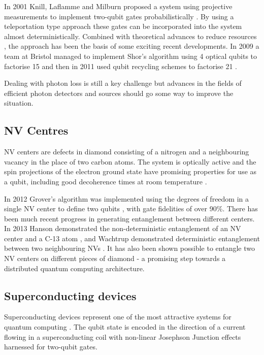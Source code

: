 In 2001 Knill, Laflamme and Milburn proposed a system using projective measurements to implement two-qubit gates probabilistically \cite{klm}. By using a teleportation type approach these gates can be incorporated into the system almost deterministically. Combined with theoretical advances to reduce resources \cite{science_loqc_review}, the approach has been the basis of some exciting recent developments. In 2009 a team at Bristol managed to implement Shor's algorithm using 4 optical qubits to factorise 15 \cite{shor_chip_bristol} and then in 2011 used qubit recycling schemes to factorise 21 \cite{shor_chip_bristol_2}.  

Dealing with photon loss is still a key challenge but advances in the fields of efficient photon detectors \cite{single_photon_detector_review_09} and sources \cite{single_photon_source_review_04} should go some way to improve the situation.

\subsection{NV Centres}

NV centers are defects in diamond consisting of a nitrogen and a neighbouring vacancy in the place of two carbon atoms. The system is optically active and the spin projections of the electron ground state have promising properties for use as a qubit, including good decoherence times at room temperature \cite{nv_review, nv_oscillation_04}. 

In 2012 Grover's algorithm was implemented using the degrees of freedom in a single NV center to define two qubits \cite{two_qubit_nv}, with gate fidelities of over 90\%. There has been much recent progress in generating entanglement between different centers. In 2013 Hanson demonstrated the non-deterministic entanglement of an NV center and a C-13 atom \cite{nv_entanglement_hanson}, and Wachtrup demonstrated deterministic entanglement between two neighbouring NVs \cite{nv_entanglement_wachtrup}. It has also been shown possible to entangle two NV centers on different pieces of diamond \cite{remote_nv_entanglement_hanson} - a promising step towards a distributed quantum computing architecture.  

\subsection{Superconducting devices}

Superconducting devices represent one of the most attractive systems for quantum computing  \cite{superconducting_review_11}. The qubit state is encoded in the direction of a current flowing in a superconducting coil with  non-linear Josephson Junction \cite{josephson_junction} effects harnessed for two-qubit gates.

